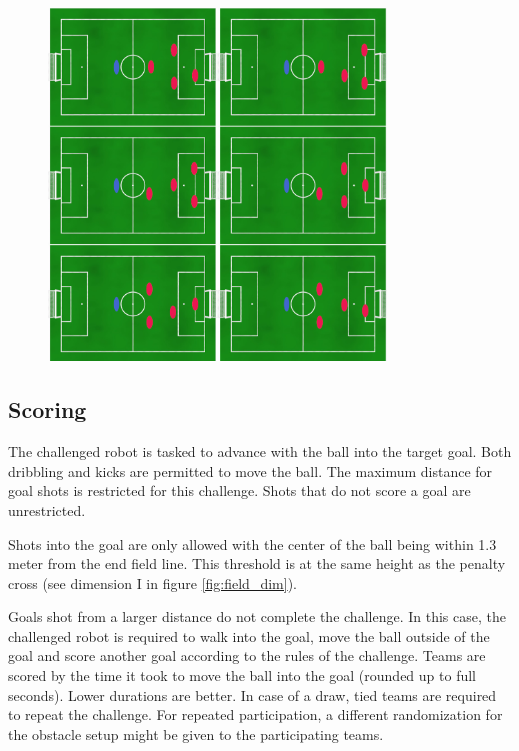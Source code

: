 
\begin{figure}[ht]
    \centering
	\includegraphics[width=0.8\textwidth]{figs/obstacle_challenge_2021_a.jpeg}
\end{figure}

\subsection{Scoring}

The challenged robot is tasked to advance with the ball into the target goal. Both dribbling and kicks are permitted to move the ball. The maximum distance for goal shots is restricted for this challenge. Shots that do not score a goal are unrestricted.

Shots into the goal are only allowed with the center of the ball being within 1.3 meter from the end field line. This threshold is at the same height as the penalty cross (see dimension I in figure \ref{fig:field_dim}).

Goals shot from a larger distance do not complete the challenge. In this case, the challenged robot is required to walk into the goal, move the ball outside of the goal and score another goal according to the rules of the challenge.
Teams are scored by the time it took to move the ball into the goal (rounded up to full seconds). Lower durations are better. In case of a draw, tied teams are required to repeat the challenge. For repeated participation, a different randomization for the obstacle setup might be given to the participating teams.

